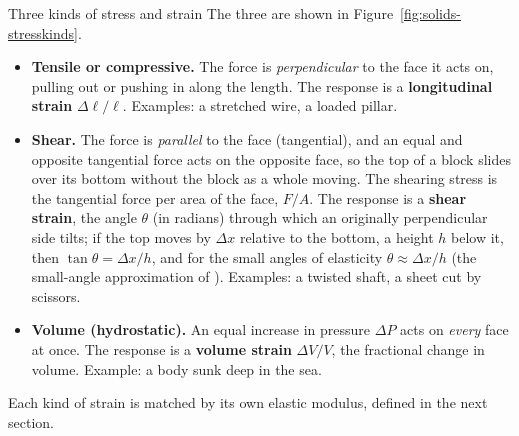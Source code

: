 \begin{defbox}{Three kinds of stress and strain}
The three are shown in Figure~\ref{fig:solids-stresskinds}.
\begin{itemize}
\item \textbf{Tensile or compressive.} The force is \emph{perpendicular} to the face it acts on,
      pulling out or pushing in along the length. The response is a \textbf{longitudinal strain}
      $\Delta\ell/\ell$. Examples: a stretched wire, a loaded pillar.
\item \textbf{Shear.} The force is \emph{parallel} to the face (tangential), and an equal and opposite
      tangential force acts on the opposite face, so the top of a block slides over its bottom without
      the block as a whole moving. The shearing stress is the tangential force per area of the face,
      $F/A$. The response is a \textbf{shear strain}, the angle $\theta$ (in radians) through which an
      originally perpendicular side tilts; if the top moves by $\Delta x$ relative to the bottom, a
      height $h$ below it, then $\tan\theta=\Delta x/h$, and for the small angles of elasticity
      $\theta\approx\Delta x/h$ (the small-angle approximation of ). Examples: a twisted
      shaft, a sheet cut by scissors.
\item \textbf{Volume (hydrostatic).} An equal increase in pressure $\Delta P$ acts on \emph{every} face
      at once. The response is a \textbf{volume strain} $\Delta V/V$, the fractional change in volume.
      Example: a body sunk deep in the sea.
\end{itemize}
Each kind of strain is matched by its own elastic modulus, defined in the next section.
\end{defbox}

\begin{figure}[htbp]
\centering
{}
\end{figure}

